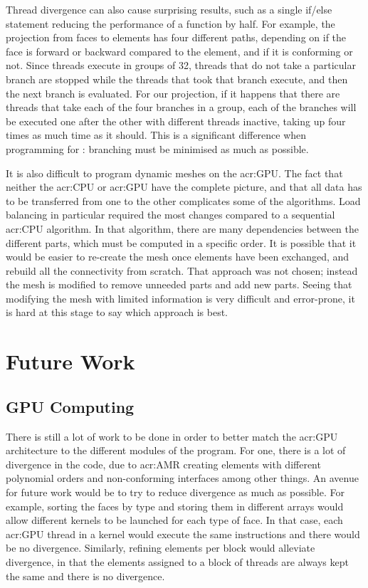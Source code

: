 Thread divergence can also cause surprising results, such as a single if/else statement reducing the
performance of a function by half. For example, the projection from faces to elements has four
different paths, depending on if the face is forward or backward compared to the element, and if it
is conforming or not. Since threads execute in groups of 32, threads that do not take a particular
branch are stopped while the threads that took that branch execute, and then the next branch is
evaluated. For our projection, if it happens that there are threads that take each of the four
branches in a group, each of the branches will be executed one after the other with different
threads inactive, taking up four times as much time as it should. This is a significant difference
when programming for : branching must be minimised as much as possible.

It is also difficult to program dynamic meshes on the \acrshort{acr:GPU}. The fact that neither the
\acrshort{acr:CPU} or \acrshort{acr:GPU} have the complete picture, and that all data has to be
transferred from one to the other complicates some of the algorithms. Load balancing in particular
required the most changes compared to a sequential \acrshort{acr:CPU} algorithm. In that algorithm,
there are many dependencies between the different parts, which must be computed in a specific order.
It is possible that it would be easier to re-create the mesh once elements have been exchanged, and
rebuild all the connectivity from scratch. That approach was not chosen; instead the mesh is
modified to remove unneeded parts and add new parts. Seeing that modifying the mesh with limited
information is very difficult and error-prone, it is hard at this stage to say which approach is
best.

\section{Future Work}\label{section:conclusion:future_work}

\subsection{GPU Computing}\label{subsection:conclusion:future_work:gpu}

There is still a lot of work to be done in order to better match the \acrshort{acr:GPU} architecture
to the different modules of the program. For one, there is a lot of divergence in the code, due to
\acrshort{acr:AMR} creating elements with different polynomial orders and non-conforming interfaces
among other things. An avenue for future work would be to try to reduce divergence as much as
possible. For example, sorting the faces by type and storing them in different arrays would allow
different kernels to be launched for each type of face. In that case, each \acrshort{acr:GPU} thread
in a kernel would execute the same instructions and there would be no divergence. Similarly,
refining elements per block would alleviate divergence, in that the elements assigned to a block of
threads are always kept the same and there is no divergence.


